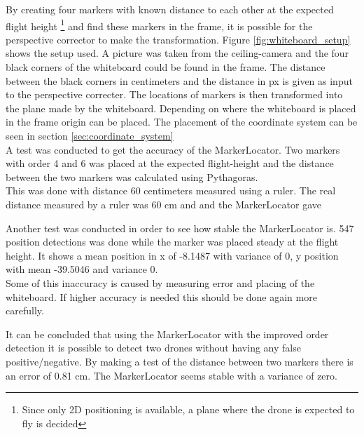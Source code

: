 By creating four markers with known distance to each other at the expected flight height \footnote{Since only 2D positioning is available, a plane where the drone is expected to fly is decided} and find these markers in the frame, it is possible for the perspective corrector to make the transformation.
Figure \ref{fig:whiteboard_setup} shows the setup used. A picture was taken from the ceiling-camera and the four black corners of the whiteboard could be found in the frame. The distance between the black corners in centimeters and the distance in px is given as input to the perspective correcter. The locations of markers is then transformed into the plane made by the whiteboard. Depending on where the whiteboard is placed in the frame origin can be placed. The placement of the coordinate system can be seen in section \ref{sec:coordinate_system}\\


A test was conducted to get the accuracy of the MarkerLocator. Two markers with order 4 and 6 was placed at the expected flight-height and the distance between the two markers was calculated using Pythagoras.\\
This was done with distance 60 centimeters measured using a ruler. 
The real distance measured by a ruler was 60 cm and and the MarkerLocator gave 

Another test was conducted in order to see how stable the MarkerLocator is. 547 position detections was done while the marker was placed steady at the flight height. It shows a mean position in x of -8.1487 with variance of 0, y position with mean -39.5046 and variance 0. \\

Some of this inaccuracy is caused by measuring error and placing of the whiteboard. If higher accuracy is needed this should be done again more carefully.

It can be concluded that using the MarkerLocator with the improved order detection it is possible to detect two drones without having any false positive/negative. By making a test of the distance between two markers there is an error of 0.81 cm. The MarkerLocator seems stable with a variance of zero. 


